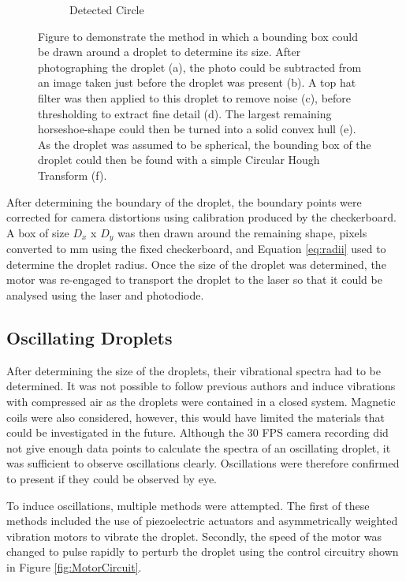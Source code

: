 \documentclass{physics_article_B}
\begin{document}
\begin{figure}[H]
\begin{subfigure}[b]{0.3\textwidth}
                        \caption{Detected Circle}
                        \label{fig:size:6}
                    \end{subfigure}
                    \caption{Figure to demonstrate the method in which a bounding box could be drawn around a droplet to determine its size. After photographing the droplet (a), the photo could be subtracted from an image taken just before the droplet was present (b). A top hat filter was then applied to this droplet to remove noise (c), before thresholding to extract fine detail (d). The largest remaining horseshoe-shape could then be turned into a solid convex hull (e). As the droplet was assumed to be spherical, the bounding box of the droplet could then be found with a simple Circular Hough Transform (f).}\label{fig:size}
                \end{figure}
            
            After determining the boundary of the droplet, the boundary points were corrected for camera distortions using calibration produced by the checkerboard. A box of size $D_x$ x $D_y$ was then drawn around the remaining shape, pixels converted to mm using the fixed checkerboard, and Equation \ref{eq:radii} used to determine the droplet radius. Once the size of the droplet was determined, the motor was re-engaged to transport the droplet to the laser so that it could be analysed using the laser and photodiode.
    
    \subsection{Oscillating Droplets\label{sect:method:oscillating}}
        
        After determining the size of the droplets, their vibrational spectra had to be determined. It was not possible to follow previous authors and induce vibrations with compressed air\cite{Temperton2012,Sharp2011} as the droplets were contained in a closed system. Magnetic coils were also considered, however, this would have limited the materials that could be investigated in the future. Although the 30 FPS camera recording did not give enough data points to calculate the spectra of an oscillating droplet, it was sufficient to observe oscillations clearly. Oscillations were therefore confirmed to present if they could be observed by eye.
        
        To induce oscillations, multiple methods were attempted. The first of these methods included the use of piezoelectric actuators and asymmetrically weighted vibration motors to vibrate the droplet. Secondly, the speed of the motor was changed to pulse rapidly to perturb the droplet using the control circuitry shown in Figure \ref{fig:MotorCircuit}. 
        
\end{document}
